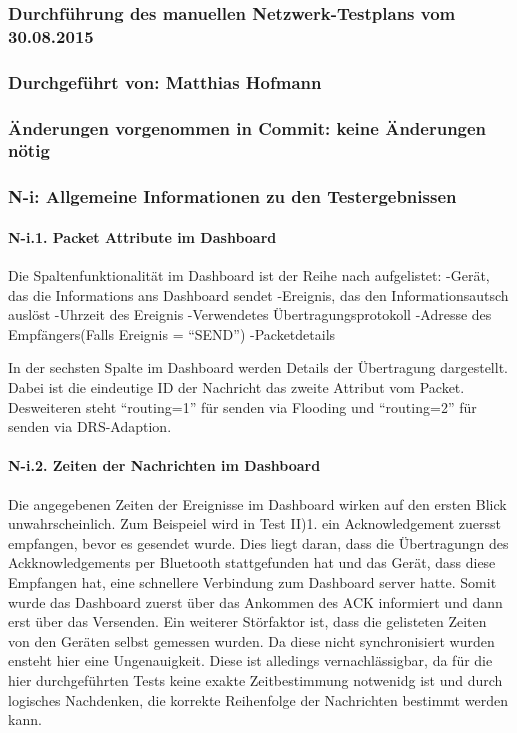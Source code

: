 \subsubsection{Durchführung des manuellen Netzwerk-Testplans vom 30.08.2015}

\subsubsection{Durchgeführt von: Matthias Hofmann}

\subsubsection{Änderungen vorgenommen in Commit: keine Änderungen nötig}

\subsubsection{N-i: Allgemeine Informationen zu den Testergebnissen}

\paragraph{N-i.1. Packet Attribute im Dashboard}
Die Spaltenfunktionalität im Dashboard ist der Reihe nach aufgelistet:
-Gerät, das die Informations ans Dashboard sendet
-Ereignis, das den Informationsautsch auslöst
-Uhrzeit des Ereignis
-Verwendetes Übertragungsprotokoll
-Adresse des Empfängers(Falls Ereignis = ``SEND'')
-Packetdetails

In der sechsten Spalte im Dashboard werden Details der Übertragung dargestellt. 
Dabei ist die eindeutige ID der Nachricht das zweite Attribut vom Packet.
Desweiteren steht ``routing=1'' für senden via Flooding und ``routing=2'' für senden via DRS-Adaption.

\paragraph{N-i.2. Zeiten der Nachrichten im Dashboard}
Die angegebenen Zeiten der Ereignisse im Dashboard wirken auf den ersten Blick unwahrscheinlich. 
Zum Beispeiel wird in Test II)1. ein Acknowledgement zuersst empfangen, bevor es gesendet wurde.
Dies liegt daran, dass die Übertragungn des Ackknowledgements per Bluetooth stattgefunden hat und das Gerät, 
dass diese Empfangen hat, eine schnellere Verbindung zum Dashboard server hatte. 
Somit wurde das Dashboard zuerst über das Ankommen des ACK informiert und dann erst über das Versenden.
Ein weiterer Störfaktor ist, dass die gelisteten Zeiten von den Geräten selbst gemessen wurden. Da diese nicht synchronisiert wurden ensteht hier eine Ungenauigkeit. Diese ist alledings vernachlässigbar, da für die hier durchgeführten Tests keine exakte Zeitbestimmung notwenidg ist und durch logisches Nachdenken, die korrekte Reihenfolge der Nachrichten bestimmt werden kann.



